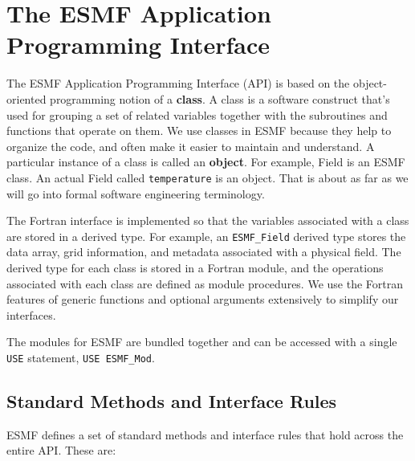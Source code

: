 
\section{The ESMF Application Programming Interface}

The ESMF Application Programming Interface (API) is based on the
object-oriented programming notion of a {\bf class}.  A class is a 
software construct that's used for grouping a set of related variables 
together with the subroutines and functions that operate on them.  We 
use classes in ESMF because they help to organize the code, and often 
make it easier to maintain and understand.  A particular instance
of a class is called an {\bf object}.  For example, Field is an 
ESMF class.  An actual Field called {\tt temperature} is an object. 
That is about as far as we will go into formal software engineering
terminology.  

The Fortran interface is implemented so that the variables associated
with a class are stored in a derived type.  For example, an 
{\tt ESMF\_Field} derived type stores the data array, grid 
information, and metadata associated with a physical field.
The derived type for each class is stored in a Fortran module, and 
the operations associated with each class are defined as module
procedures.  We use the Fortran features of generic functions and
optional arguments extensively to simplify our interfaces.

The modules for ESMF are bundled together and can be accessed with a 
single {\tt USE} statement, {\tt USE ESMF\_Mod}.

\subsection{Standard Methods and Interface Rules}

ESMF defines a set of standard methods and interface rules that
hold across the entire API.  These are: 

